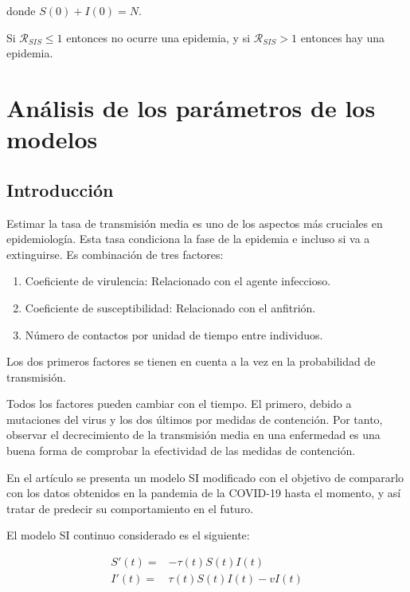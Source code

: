 donde $S(0)+I(0)=N$.

Si $\mathcal{R}_{SIS}\leq 1$ entonces no ocurre una epidemia, y si $\mathcal{R}_{SIS} > 1$ entonces hay una epidemia.


\section{Análisis de los parámetros de los modelos}

\subsection{Introducción}

Estimar la tasa de transmisión media es uno de los aspectos más cruciales en epidemiología. Esta tasa condiciona la fase de la epidemia e incluso si va a extinguirse. Es combinación de tres factores:

\begin{enumerate}
\item Coeficiente de virulencia: Relacionado con el agente infeccioso.
\item Coeficiente de susceptibilidad: Relacionado con el anfitrión.
\item Número de contactos por unidad de tiempo entre individuos.
\end{enumerate}

Los dos primeros factores se tienen en cuenta a la vez en la probabilidad de transmisión.

Todos los factores pueden cambiar con el tiempo. El primero, debido a mutaciones del virus y los dos últimos por medidas de contención. Por tanto, observar el decrecimiento de la transmisión media en una enfermedad es una buena forma de comprobar la efectividad de las medidas de contención.

En el artículo \cite{demongeotSIEpidemicModel} se presenta un modelo SI modificado con el objetivo de compararlo con los datos obtenidos en la pandemia de la COVID-19 hasta el momento, y así tratar de predecir su comportamiento en el futuro.

El modelo SI continuo considerado es el siguiente:

\begin{equation}
\label{eqn: SI_cont}
\begin{aligned}
S'(t) = & -\tau (t)S(t)I(t) \\
I'(t) = & \tau (t)S(t)I(t) -vI(t)
\end{aligned}
\end{equation}

